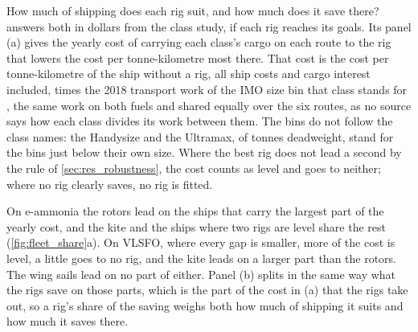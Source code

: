 How much of shipping does each rig suit, and how much does it save there?  answers both in dollars from the class study, if each rig reaches its goals. Its panel (a) gives the yearly cost of carrying each class's cargo on each route to the rig that lowers the cost per tonne-kilometre most there. That cost is the cost per tonne-kilometre of the ship without a rig, all ship costs and cargo interest included, times the 2018 transport work of the IMO size bin that class stands for \citep{faber2020}, the same work on both fuels and shared equally over the six routes, as no source says how each class divides its work between them. The bins do not follow the class names: the Handysize and the Ultramax, of  tonnes deadweight, stand for the bins just below their own size. Where the best rig does not lead a second by the rule of \cref{sec:res_robustness}, the cost counts as level and goes to neither; where no rig clearly saves, no rig is fitted.

On e-ammonia the rotors lead on the ships that carry the largest part of the yearly cost, and the kite and the ships where two rigs are level share the rest (\cref{fig:fleet_share}a). On VLSFO, where every gap is smaller, more of the cost is level, a little goes to no rig, and the kite leads on a larger part than the rotors. The wing sails lead on no part of either. Panel (b) splits in the same way what the rigs save on those parts, which is the part of the cost in (a) that the rigs take out, so a rig's share of the saving weighs both how much of shipping it suits and how much it saves there.

